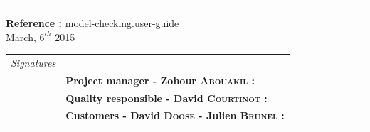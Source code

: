 \documentclass{report}
\begin{document}
\begin{titlepage}


\vspace*{4.5cm}

\noindent
\begin{minipage}{0.35\linewidth}
    \begin{flushright}
        \printauthor
    \end{flushright}
\end{minipage} \hspace{15pt}
%
\begin{minipage}{0.02\linewidth}
    \rule{1pt}{175pt}
\end{minipage} \hspace{-10pt}
%
\begin{minipage}{0.6\linewidth}
\vspace{5pt}
\newenvironment{test}{\begin{center}}{\end{center}}
\hspace{10pt}
\begin{minipage}{\linewidth} 
\textbf{Reference :} model-checking.user-guide ~\\
March, $6^{th}$ 2015
\end{minipage}
\end{minipage}

\vspace{8cm}
\begin{minipage}{0.20\linewidth}
    \begin{flushright}
       
        \begin{tabular}{ll}
	 \textit{Signatures} & \\
			& \textbf{Project manager - Zohour \textsc{Abouakil} :} \\
            & \textbf{Quality responsible - David \textsc{Courtinot} :} \\
            & \textbf{Customers - David \textsc{Doose} - Julien \textsc{Brunel} :} \\
        \end{tabular}
    \end{flushright}
\end{minipage}

\end{titlepage}
\end{document}
